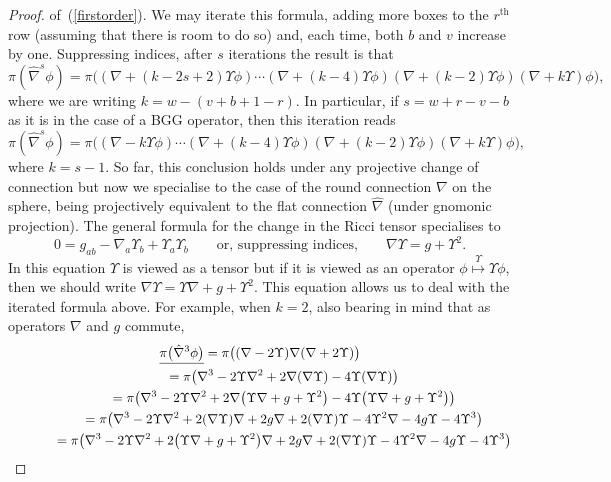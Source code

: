 \documentclass[11pt]{article}
\begin{document}
\begin{proof}
of~(\ref{firstorder}). We may iterate this formula, adding more boxes to the
$r^{\mathrm{th}}$ row (assuming that there is room to do so) and, each time,
both $b$ and $v$ increase by one. Suppressing indices, after $s$
iterations the result is that
\[\pi(\hat\nabla^s\phi)=\pi\big(
(\nabla+(k-2s+2)\Upsilon\phi)\cdots
(\nabla+(k-4)\Upsilon\phi)(\nabla+(k-2)\Upsilon\phi)
(\nabla+k\Upsilon)\phi\big),\]
where we are writing $k=w-(v+b+1-r)$. In particular, if $s=w+r-v-b$ as it
is in the case of a BGG operator, then this iteration reads
\[\pi(\hat\nabla^s\phi)=\pi\big(
(\nabla-k\Upsilon\phi)\cdots
(\nabla+(k-4)\Upsilon\phi)(\nabla+(k-2)\Upsilon\phi)
(\nabla+k\Upsilon)\phi\big),\]
where $k=s-1$.
So far, this conclusion holds under any projective change of connection but now
we specialise to the case of the round connection $\nabla$ on the sphere, being
projectively equivalent to the f\/lat connection $\hat\nabla$ (under gnomonic
projection). The general formula \cite[(3.4)]{eProjective} for the
change in the Ricci tensor specialises to
\[0=g_{ab}-\nabla_a\Upsilon_b+\Upsilon_a\Upsilon_b\qquad\mbox{or, suppressing
indices,}\qquad\nabla\Upsilon=g+\Upsilon^2.\]
In this equation $\Upsilon$ is viewed as a tensor but if it is viewed as an
operator $\phi\stackrel{\Upsilon}{\longmapsto}\Upsilon\phi$, then we should
write $\nabla\Upsilon=\Upsilon\nabla+g+\Upsilon^2$. This equation allows us to
deal with the iterated formula above. For example, when $k=2$, also bearing in
mind that as operators $\nabla$ and $g$ commute,
 \begin{gather*}
 \underline{\pi\big(\hat\nabla^3\phi\big)}=
 \pi\big((\nabla-2\Upsilon)\nabla(\nabla+2\Upsilon)\big)\\
\hphantom{\underline{\pi\big(\hat\nabla^3\phi\big)}}{} = \pi\big(\nabla^3-2\Upsilon\nabla^2+2\nabla(\nabla\Upsilon)
-4\Upsilon(\nabla\Upsilon)\big)\\
\hphantom{\underline{\pi\big(\hat\nabla^3\phi\big)}}{} =
\pi\big(\nabla^3-2\Upsilon\nabla^2+2\nabla\big(\Upsilon\nabla+g+\Upsilon^2\big)
-4\Upsilon\big(\Upsilon\nabla+g+\Upsilon^2\big)\big)\\
\hphantom{\underline{\pi\big(\hat\nabla^3\phi\big)}}{} = \pi\big(\nabla^3-2\Upsilon\nabla^2+2(\nabla\Upsilon)\nabla+2g\nabla
+2(\nabla\Upsilon)\Upsilon
-4\Upsilon^2\nabla-4g\Upsilon-4\Upsilon^3\big)\\
\hphantom{\underline{\pi\big(\hat\nabla^3\phi\big)}}{} = \pi\big(\nabla^3-2\Upsilon\nabla^2+2\big(\Upsilon\nabla+g+\Upsilon^2\big)\nabla+2g\nabla
+2(\nabla\Upsilon)\Upsilon
-4\Upsilon^2\nabla-4g\Upsilon-4\Upsilon^3\big)\\

\end{gather*}
\end{proof}
\end{document}
